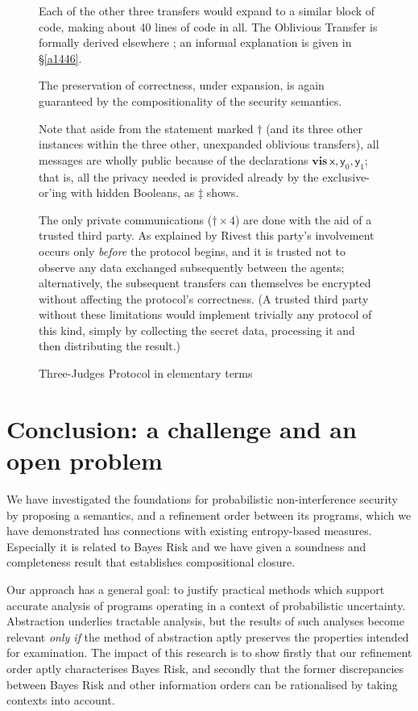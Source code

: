 \documentclass[runningheads]{llncs}
\newcommand\Vx {\mathsf{x}}
\newcommand\Vy {\mathsf{y}}
\newcommand\App[1] {App.~\ref{#1}}
\renewcommand\App[1] {\S\ref{#1}}
\newcommand\Vis {\textbf{vis}}
\newenvironment{Figure}[2][t]{\begin{figure}[#1]\def\Label{#2}\small}{\label{\Label}\end{figure}}
\begin{document}
\begin{Figure}[ht!]{f1641}
Each of the other three transfers would expand to a similar block of code, making about 40 lines of code in all. The Oblivious Transfer is formally derived elsewhere \cite{Morgan:07}; an informal explanation is given in \App{a1446}.

\medskip
The preservation of correctness, under expansion, is again guaranteed by the compositionality of the security semantics.

\medskip
Note that aside from the statement marked $\dagger$ (and its three other instances within the three other, unexpanded oblivious transfers), all messages are wholly public because of the declarations $\Vis~\Vx,\Vy_0,\Vy_1$; that is, all the privacy needed is provided already by the exclusive-or'ing with hidden Booleans, as $\ddagger$ shows. 

The only private communications ($\dagger\times4$) are done with the aid of a trusted third party. As explained by Rivest \cite{Rivest:99,Morgan:07} this party's involvement occurs only \emph{before} the protocol begins, and it is trusted not to observe any data exchanged subsequently between the agents; alternatively, the subsequent transfers can themselves be encrypted without affecting the protocol's correctness. (A trusted third party without these limitations would implement trivially any protocol of this kind, simply by collecting the secret data, processing it and then distributing the result.)

\caption{Three-Judges Protocol in elementary terms}
\end{Figure}


\section{Conclusion: a challenge and an open problem}\label{s1731}
We have investigated the foundations for probabilistic non-interference security by proposing a semantics, and a refinement order between its programs, which we have demonstrated has connections with existing entropy-based measures. Especially it is related to Bayes Risk and we have given a soundness and completeness result that establishes compositional closure.

Our approach has a  general goal: to justify practical methods which support accurate analysis of programs operating in a context of probabilistic uncertainty. Abstraction underlies tractable analysis, but the results of such analyses become relevant \emph{only if} the method of abstraction aptly preserves the properties intended for examination. The impact of this research is to show firstly that our refinement order aptly characterises Bayes Risk, and secondly that the former discrepancies between Bayes Risk and other information orders can be rationalised by taking contexts into account.
\end{document}
